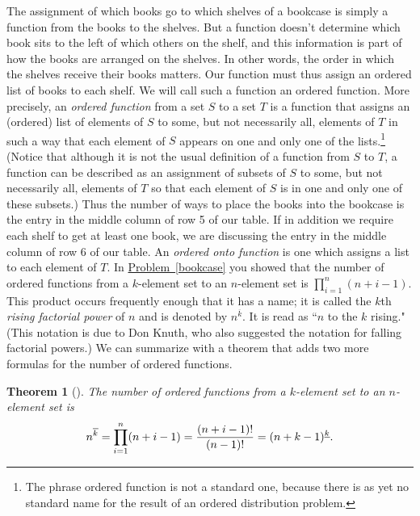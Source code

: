 \documentclass[10pt,]{book}
\theoremstyle{plain}
\newtheorem{theorem}{Theorem}[section]
\theoremstyle{definition}
\numberwithin{equation}{chapter}
\begin{document}
The assignment of which books go to which shelves of a bookcase is simply a function from the books to the shelves. But a function doesn't determine which book sits to the left of which others on the shelf, and this information is part of how the books are arranged on the shelves. In other words, the order in which the shelves receive their books matters. Our function must thus assign an ordered list of books to each shelf. We will call such a function an ordered function. More precisely, an \emph{ordered function} from a set \(S\) to a set \(T\) is a function that assigns an (ordered) list of elements of \(S\) to some, but not necessarily all, elements of \(T\) in such a way that each element of \(S\) appears on one and only one of the lists.\footnote{The phrase ordered function is not a standard one, because there is as yet no standard name for the result of an ordered distribution problem.\label{fn-3}} (Notice that although it is not the usual definition of a function from \(S\) to \(T\), a function can be described as an assignment of subsets of \(S\) to some, but not necessarily all, elements of \(T\) so that each element of \(S\) is in one and only one of these subsets.) Thus the number of ways to place the books into the bookcase is the entry in the middle column of row 5 of our table. If in addition we require each shelf to get at least one book, we are discussing the entry in the middle column of row 6 of our table. An \emph{ordered onto function} is one which assigns a list to each element of \(T\). In \hyperref[bookcase]{Problem~\ref{bookcase}} you showed that the number of ordered functions from a \(k\)-element set to an \(n\)-element set is \(\displaystyle
\prod_{i=1}^n (n+i-1)\). This product occurs frequently enough that it has a name; it is called the \(k\)\/th \emph{rising factorial power} of \(n\) and is denoted by \(n^{\overline{k}}\). It is read as ``\(n\) to the \(k\) rising." (This notation is due to Don Knuth, who also suggested the notation for falling factorial powers.) We can summarize with a theorem that adds two more formulas for the number of ordered functions.%
\begin{theorem}[{}]\label{theorem-4}
The number of ordered functions from a \(k\)-element set to an \(n\)-element set is%
\begin{equation*}
n^{\overline{k}}=\prod_{i=1}^n (n+i-1) = {(n+i-1)!\over (n-1)!} =
(n+k-1)^{\underline{k}}.
\end{equation*}
%
\end{theorem}
\typeout{************************************************}
\typeout{************************************************}
\end{document}
